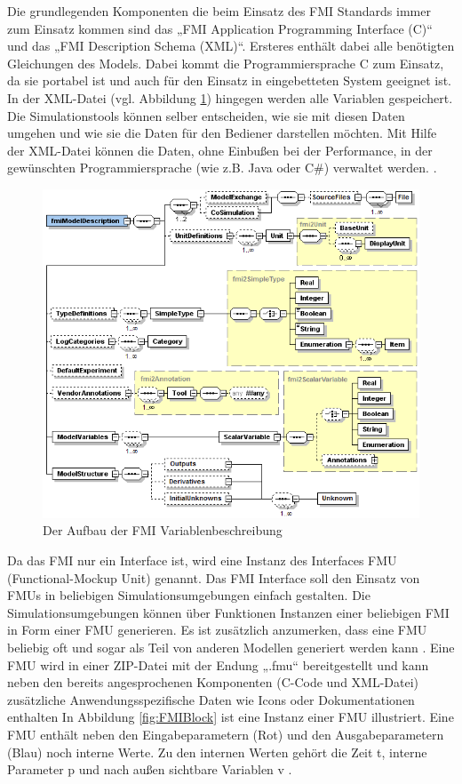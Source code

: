 Die grundlegenden Komponenten die beim Einsatz des FMI Standards immer zum Einsatz kommen sind das „FMI Application Programming Interface (C)“ und das „FMI Description Schema (XML)“. Ersteres enthält dabei alle benötigten Gleichungen des Models. Dabei kommt die Programmiersprache C zum Einsatz, da sie portabel ist und auch für den Einsatz in eingebetteten System geeignet ist. In der XML-Datei (vgl. Abbildung \ref{fig:FMIOverview}) hingegen werden alle Variablen gespeichert. Die Simulationstools können selber entscheiden, wie sie mit diesen Daten umgehen und wie sie die Daten für den Bediener darstellen möchten. Mit Hilfe der XML-Datei können die Daten, ohne Einbußen bei der Performance, in der gewünschten Programmiersprache (wie z.B. Java oder C\#) verwaltet werden.
\cite[S.8]{25}.
\newpage
\begin{figure}[h]
	\centering
	\includegraphics[width=0.7\linewidth]{Bilder/A20_FMIOverview}
	\caption{Der Aufbau der FMI Variablenbeschreibung \cite[S.30]{25}}
	\label{fig:FMIOverview}
\end{figure}
\noindent Da das FMI nur ein Interface ist, wird eine Instanz des Interfaces FMU (Functional-Mockup Unit) genannt. Das FMI Interface soll den Einsatz von FMUs in beliebigen Simulationsumgebungen einfach gestalten. Die Simulationsumgebungen können über Funktionen Instanzen einer beliebigen FMI in Form einer FMU generieren. Es ist zusätzlich anzumerken, dass eine FMU beliebig oft und sogar als Teil von anderen Modellen generiert werden kann \cite[S.8]{25}. Eine FMU wird in einer ZIP-Datei mit der Endung „.fmu“ bereitgestellt und kann neben den bereits angesprochenen Komponenten (C-Code und XML-Datei) zusätzliche Anwendungsspezifische Daten wie Icons oder Dokumentationen enthalten \cite[S.4+9]{25} In Abbildung \ref{fig:FMIBlock} ist eine Instanz einer FMU illustriert. Eine FMU enthält neben den Eingabeparametern (Rot) und den Ausgabeparametern (Blau) noch interne Werte. Zu den internen Werten gehört die Zeit t, interne Parameter p und nach außen sichtbare Variablen v \cite[S.8]{25}.
